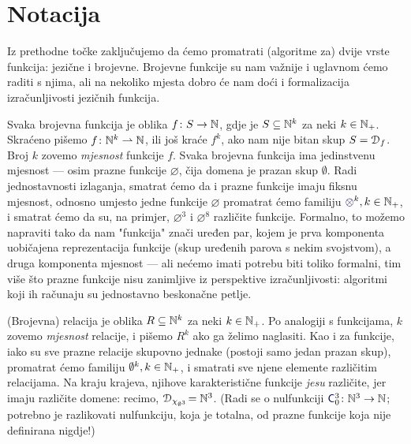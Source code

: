 \section{Notacija}

Iz prethodne točke zaključujemo da ćemo promatrati (algoritme za) dvije vrste funkcija: jezične i brojevne. Brojevne funkcije su nam važnije i uglavnom ćemo raditi s njima, ali na nekoliko mjesta dobro će nam doći i formalizacija izračunljivosti jezičnih funkcija.

Svaka brojevna funkcija je oblika $f\colon S\to{\mathbb N}$, gdje je $S\subseteq{\mathbb N}^k$ za neki $k\in{\mathbb N}_+$. Skraćeno pišemo $f\colon{\mathbb N}^k\rightharpoonup{\mathbb N}$, ili još kraće $f^k$, ako nam nije bitan skup $S=\mathcal D_{f}$. Broj $k$ zovemo \emph{mjesnost} funkcije $f$. Svaka brojevna funkcija ima jedinstvenu mjesnost --- osim prazne funkcije $\varnothing$, čija domena je prazan skup $\emptyset$. Radi jednostavnosti izlaganja, smatrat ćemo da i prazne funkcije imaju fiksnu mjesnost, odnosno umjesto jedne funkcije $\varnothing$ promatrat ćemo familiju $\varnothing^k,k\in\N_+$, i smatrat ćemo da su, na primjer, $\varnothing^3$ i $\varnothing^8$ različite funkcije. Formalno, to možemo napraviti tako da nam "funkcija" znači uređen par, kojem je prva komponenta uobičajena reprezentacija funkcije (skup uređenih parova s nekim svojstvom), a druga komponenta mjesnost --- ali nećemo imati potrebu biti toliko formalni, tim više što prazne funkcije nisu zanimljive iz perspektive izračunljivosti: algoritmi koji ih računaju su jednostavno beskonačne petlje.

(Brojevna) relacija je oblika $R\subseteq{\mathbb N}^k$ za neki $k\in{\mathbb N}_+$. Po analogiji s funkcijama, $k$ zovemo \emph{mjesnost} relacije, i pišemo $R^k$ ako ga želimo naglasiti. Kao i za funkcije, iako su sve prazne relacije skupovno jednake (postoji samo jedan prazan skup), promatrat ćemo familiju $\emptyset^k,k\in{\mathbb N}_+$, i smatrati sve njene elemente različitim relacijama. Na kraju krajeva, njihove karakteristične funkcije \emph{jesu} različite, jer imaju različite domene: recimo, $\mathcal D_{\chi_{\emptyset^3}}\!={\mathbb N}^3$. (Radi se o nulfunkciji $\f C_0^3\colon\N^3\to\N$; potrebno je razlikovati nulfunkciju, koja je totalna, od prazne funkcije koja nije definirana nigdje!)

